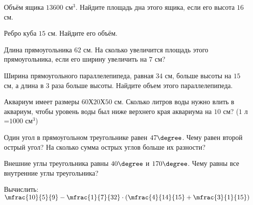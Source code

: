 \begin{exam}
	\begin{listofex}
		\item Объём ящика \( 13600 \) см\( ^3 \). Найдите площадь дна этого ящика, если его высота \( 16 \) см.
		\item Ребро куба \( 15 \) см. Найдите его объём.
		\item Длина прямоугольника \( 62 \) см. На сколько увеличится площадь этого прямоугольника, если его ширину увеличить на \( 7 \) см?
		\item Ширина прямоугольного параллелепипеда, равная \( 34 \) см, больше высоты на \( 15 \) см, а длина в \( 3 \) раза больше высоты. Найдите объем этого параллелепипеда.
		\item Аквариум имеет размеры \( 60 \)Х\( 20 \)Х\( 50 \) см. Сколько литров воды нужно влить в аквариум, чтобы уровень воды был ниже верхнего края аквариума на \( 10 \) см? (\( 1 \) л =\( 1000 \) см\( ^3 \))
		\item Один угол в прямоугольном треугольнике равен \( 47\degree \). Чему равен второй острый угол? На сколько сумма острых углов больше их разности?
		\item Внешние углы треугольника равны \( 40\degree \) и \( 170\degree \). Чему равны все внутренние углы треугольника?
		\item Вычислить: \quad \( \mfrac{10}{5}{9}-\mfrac{1}{7}{32}\cdot\left( \mfrac{4}{14}{15}+\mfrac{3}{1}{15} \right) \)
	\end{listofex}
\end{exam}
